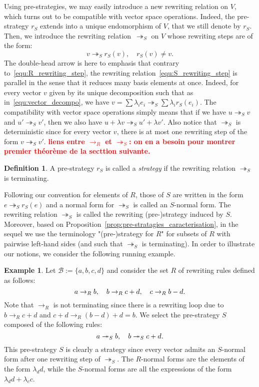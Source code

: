 \documentclass[10pt]{easychair}
\theoremstyle{definition}
\newtheorem{definition}[theorem]{Definition}
\newtheorem{example}[theorem]{Example}
\newcommand\todo[1]{{\bf\textcolor{red}{#1}}}
\newcommand\basis{\mathscr{B}}
\newcommand\rewR{\to_R}
\newcommand\rewS{\twoheadrightarrow_S}
\begin{document}
Using pre-strategies, we may easily introduce a new rewriting relation on
$V$, which turns out to be compatible with vector space operations.
Indeed, the pre-strategy $r_S$ extends into a unique endomorphism of $V$,
that we still denote by $r_S$. Then, we introduce the rewriting
relation~$\rewS$ on $V$ whose rewriting steps are of the form:
\begin{equation}\label{equ:S_rewriting_step}
  v\rewS r_S(v),\quad r_S(v)\neq v.
\end{equation}
The double-head arrow is here to emphasis that contrary
to~\eqref{equ:R_rewriting_step}, the rewriting
relation~\eqref{equ:S_rewriting_step} is parallel in the sense that it
reduces many basis elements at once. Indeed, for every vector $v$ given
by its unique decomposition such that as in~\eqref{equ:vector_decompo},
we have $v=\sum\lambda_ie_i\rewS\sum\lambda_ir_S(e_i)$. The compatibility
with vector space operations simply means that if we have $u\rewS v$ and
$u'\rewS v'$, then we also have $u+\lambda v\rewS u'+\lambda v'$. Also
notice that $\rewS$ is deterministic since for every vector $v$, there is 
at most one rewriting step of the form $v\rewS v'$. \todo{liens entre
  $\rewR$ et $\rewS$: on en a besoin pour montrer  premier théorème de la
secttion suivante.}
\smallskip

\begin{definition}
  A pre-strategy $r_S$ is called a {\em strategy} if the rewriting 
  relation $\rewS$ is terminating. 
\end{definition}
\smallskip

Following our convention for elements of $R$, those of $S$ are written in
the form $e\rewS r_S(e)$ and a normal form for $\rewS$ is called an
$S$-normal form. The rewriting relation $\rewS$ is called the rewriting
(pre-)strategy induced by $S$. Moreover, based on
Proposition~\ref{prop:pre-stratagies_caracterisation}, in the sequel we
use the terminology "(pre-)strategy for $R$" for subsets of $R$ with
pairwise left-hand sides (and such that $\rewS$ is terminating). In order
to illustrate our notions, we consider the following running example.
\smallskip

\begin{example}\label{ex:h_norma_form}
  Let $\basis:=\{a,b,c,d\}$ and consider the set $R$ of rewriting rules
  defined as follows:
  \[a\rewR b,\quad b\rewR c+d,\quad c\rewR b-d.
  \smallskip\]
  Note that $\rewR$ is not terminating since there is a rewriting loop
  due to $b\rewR c+d$ and $c+d\rewR (b-d)+d=b$. We select the
  pre-strategy $S$ composed of the following rules:
  \[a\rewS b,\quad b\rewS c+d.
  \smallskip\]
  This pre-strategy $S$ is clearly a strategy since every vector admits
  an $S$-normal form after one rewriting step of $\rewS$. The $R$-normal
  forms are the elements of the form $\lambda_dd$, while the $S$-normal
  forms are all the expressions of the form $\lambda_dd+\lambda_cc$.
\end{example}
\end{document}
